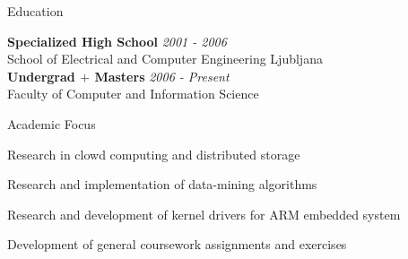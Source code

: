 \documentclass{resume} %
\begin{document}

\begin{rSection}{Education}

{\bf Specialized High School} \hfill {\em 2001 - 2006} \\ 
School of Electrical and Computer Engineering Ljubljana\\

{\bf Undergrad $+$ Masters} \hfill {\em 2006 - Present} \\ 
Faculty of Computer and Information Science \\


\begin{aSubsection}{Academic Focus}
\item Research in clowd computing and distributed storage
\item Research and implementation of data-mining algorithms
\item Research and development of kernel drivers for ARM embedded system
\item Development of general coursework assignments and exercises
\end{aSubsection}


\end{rSection}

\end{document}
